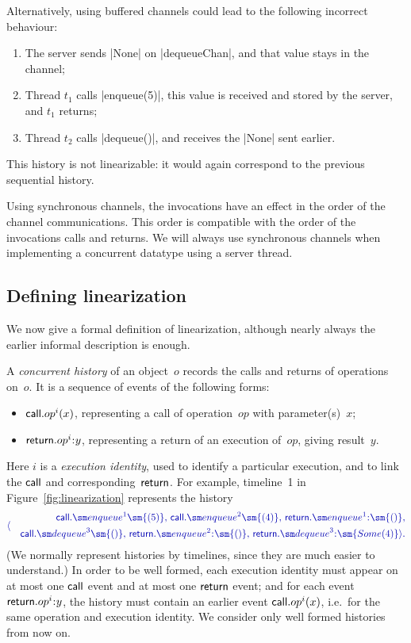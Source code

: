 Alternatively, using buffered channels could lead to the following incorrect
behaviour: 
%
\begin{enumerate}
\item The server sends |None| on |dequeueChan|, and that value stays in the
  channel; 

\item Thread $t_1$ calls |enqueue(5)|, this value is received and stored
  by the server, and $t_1$ returns;  

\item Thread $t_2$ calls |dequeue()|, and receives the |None| sent earlier.
\end{enumerate}
%
This history is not linearizable: it would again correspond to the previous
sequential history.

Using synchronous channels, the invocations have an effect in the order of the
channel communications.  This order is compatible with the order of the
invocations calls and returns.  We will always use synchronous channels when
implementing a concurrent datatype using a server thread.


\subsection{Defining linearization}

We now give a formal definition of linearization, although nearly always the
earlier informal description is enough.  

A \emph{concurrent history} of an object~$o$ records
the calls and returns of operations on~$o$.  It is a sequence of events of the
following forms:
%
\begin{itemize}
\item $\mathsf{call}.op^i(x)$, representing a call of operation~$op$ with
  parameter(s)~$x$;
\item $\return.op^i \:: y$, representing a return of an execution of~$op$,
  giving result~$y$.
\end{itemize}
%
Here $i$ is a \emph{execution identity}, used to
identify a particular execution, and to link the $\mathsf{call}$ and
corresponding~$\mathsf{return}$.  For example, timeline~1 in
Figure~\ref{fig:linearization} represents the history
\[\mstyle
\langle
  \begin{align}
  \call.\enqueue^1\sm{(5)},\, \call.\enqueue^2\sm{(4)},\,
  \return.\enqueue^1\::\sm{()}, \\
  \quad \call.\dequeue^3\sm{()},\, \return.\enqueue^2\::\sm{()},\,
  \return.\dequeue^3\::\sm{Some(4)} \rangle .
  \end{align}
\]
(We normally represent histories by timelines, since they are much easier to
understand.)  In order to be well formed, each execution identity must appear
on at most one $\mathsf{call}$ event and at most one $\mathsf{return}$ event; and for each
event $\return.op^i\::y$, the history must contain an earlier event
$\mathsf{call}.op^i(x)$, i.e.~for the same operation and execution identity.  We
consider only well formed histories from now on.  

